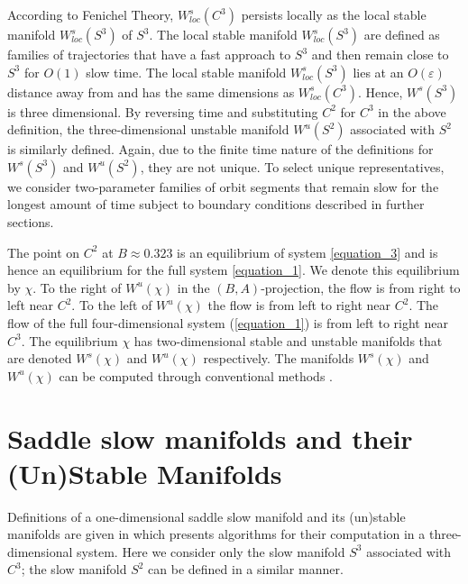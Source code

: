 \documentclass{ws-ijbc}
\begin{document}
According to Fenichel Theory, $W^{s}_{loc}(C^3)$ persists locally as the local stable manifold $W^{s}_{loc}(S^3)$ of $S^3$.  The local stable manifold $W^{s}_{loc}(S^3)$ are defined as families of trajectories that have a fast approach to $S^3$ and then remain close to $S^3$ for $O(1)$ slow time.  The local stable manifold $W^{s}_{loc}(S^3)$ lies at an $O(\varepsilon)$ distance away from and has the same dimensions as $W^{s}_{loc}(C^3)$.  Hence, $W^{s}(S^3)$ is three dimensional.  By reversing time and substituting $C^2$ for $C^3$ in the above definition, the three-dimensional unstable manifold $W^{u}(S^2)$ associated with $S^2$ is similarly defined.  Again, due to the finite time nature of the definitions for $W^{s}(S^3)$ and $W^{u}(S^2)$, they are not unique.  To select unique representatives, we consider two-parameter families of orbit segments that remain slow for the longest amount of time subject to boundary conditions described in further sections.
 
The point on $C^2$ at $B \approx 0.323$ is an equilibrium of system \ref{equation_3} and is hence an equilibrium for the full system \ref{equation_1}.  We denote this equilibrium by $\chi$.  To the right of $W^u(\chi)$ in the $(B,A)$-projection, the flow is from right to left near $C^2$.  To the left of $W^u(\chi)$ the flow is from left to right near $C^2$.  The flow of the full four-dimensional system (\ref{equation_1}) is from left to right near $C^3$.  The equilibrium $\chi$ has two-dimensional stable and unstable manifolds that are denoted $W^s(\chi)$ and $W^u(\chi)$ respectively.  The manifolds $W^s(\chi)$ and $W^u(\chi)$ can be computed through conventional methods \cite{Red_book}.  
 
 \section{Saddle slow manifolds and their (Un)Stable Manifolds}
    
Definitions of a one-dimensional saddle slow manifold and its (un)stable manifolds are given in \cite{Saeed_Paper} which presents algorithms for their computation in a three-dimensional system.  Here we consider only the slow manifold $S^3$ associated with $C^3$; the slow manifold $S^2$ can be defined in a similar manner.
    
\end{document}

